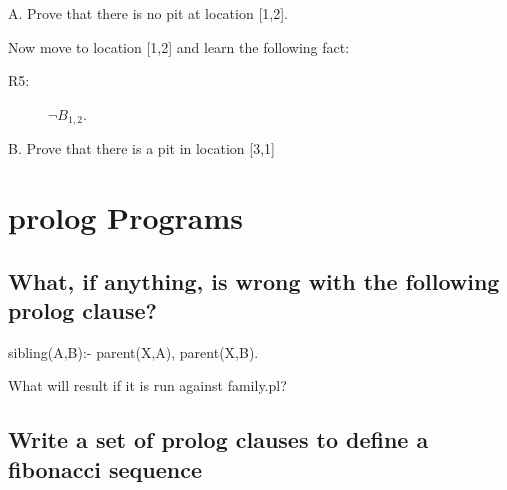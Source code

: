\documentclass[]{article}
\begin{document}
A.  Prove that there is no pit at location [1,2].

\vspace{1in}
Now move to location [1,2] and learn the following fact:
\begin{description}
\item[R5:] $\neg B_{1,2}$.
\end{description}

B.  Prove that there is a pit in location [3,1]

\newpage
\section{prolog Programs}
\subsection{What, if anything, is wrong with the following prolog clause?}
sibling(A,B):- parent(X,A), parent(X,B).
\vspace{5mm}

  What will result if it is run against family.pl?
\vspace{1in}



\subsection{Write a set of prolog clauses to define a fibonacci sequence}
\vspace{1in}
\end{document}

